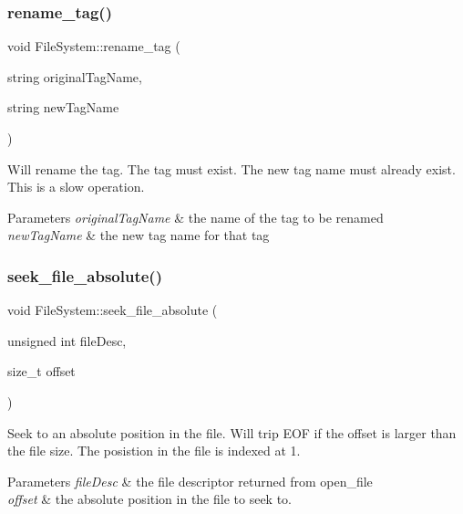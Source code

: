 \subsubsection{\texorpdfstring{rename\+\_\+tag()}{rename\_tag()}}
{\footnotesize\ttfamily void File\+System\+::rename\+\_\+tag (\begin{DoxyParamCaption}\item[{string}]{original\+Tag\+Name,  }\item[{string}]{new\+Tag\+Name }\end{DoxyParamCaption})}

Will rename the tag. The tag must exist. The new tag name must already exist. This is a slow operation. 
\begin{DoxyParams}{Parameters}
{\em original\+Tag\+Name} & the name of the tag to be renamed \\
\hline
{\em new\+Tag\+Name} & the new tag name for that tag \\
\hline
\end{DoxyParams}
\mbox{\label{classFileSystem_af2d28b0d03e0595b686be6bc0e3e22b5}} 
\subsubsection{\texorpdfstring{seek\+\_\+file\+\_\+absolute()}{seek\_file\_absolute()}}
{\footnotesize\ttfamily void File\+System\+::seek\+\_\+file\+\_\+absolute (\begin{DoxyParamCaption}\item[{unsigned int}]{file\+Desc,  }\item[{size\+\_\+t}]{offset }\end{DoxyParamCaption})}

Seek to an absolute position in the file. Will trip E\+OF if the offset is larger than the file size. The posistion in the file is indexed at 1. 
\begin{DoxyParams}{Parameters}
{\em file\+Desc} & the file descriptor returned from open\+\_\+file \\
\hline
{\em offset} & the absolute position in the file to seek to. \\
\hline
\end{DoxyParams}
\mbox{\label{classFileSystem_aee77ad983da8db9fe2de0c13b91fe977}} 
